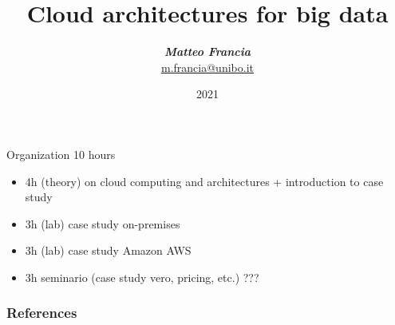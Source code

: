 \title[BigData (Module 2)]{Cloud architectures for big data}
\date[DOLAP]{2021}
\author[Matteo Francia (UniBO)]{
    \textit{\textbf{Matteo Francia}}\\
    \url{m.francia@unibo.it}
}

\begin{frame}
\titlepage
\end{frame}


\begin{frame}{Organization}
10 hours
\begin{itemize}
    \item  4h (theory) on cloud computing and architectures + introduction to case study
    \item  3h (lab) case study on-premises
    \item  3h (lab) case study Amazon AWS
    \item  3h seminario (case study vero, pricing, etc.) ???
\end{itemize}
\end{frame}

\frame{\tableofcontents}
\setlength{\parskip}{1em}


% 



\begin{frame}[allowframebreaks]
\frametitle{References}


\end{frame}